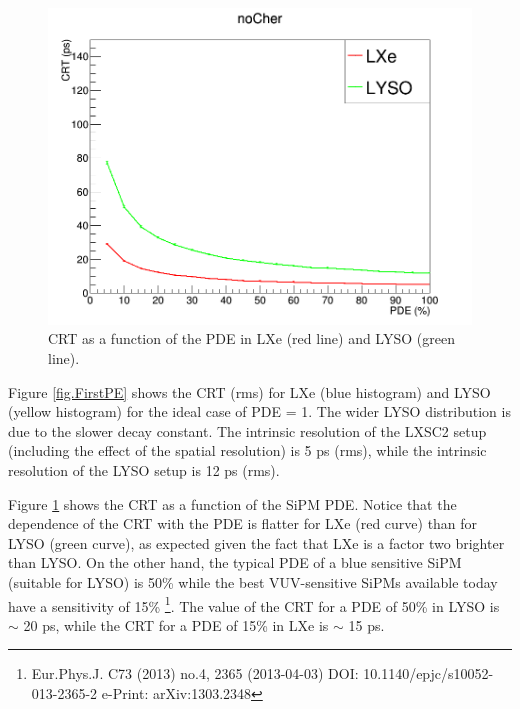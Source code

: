 \documentclass[review]{elsarticle}
\begin{document}
{\begin{figure}[!bhtp]
	\centering
	\includegraphics[scale=3]{../img/CRTvsPDELXeLYSONoJitterFstPE.png}
	\caption{\label{fig.crt1} CRT as a function of the PDE in LXe (red line) and LYSO (green line). }
\end{figure}

 Figure \ref{fig.FirstPE} shows the CRT (rms) for LXe (blue histogram) and LYSO (yellow histogram) for the ideal case of PDE = 1. The wider LYSO distribution is due to the slower decay constant. The intrinsic resolution of the LXSC2 setup (including the effect of the spatial resolution) is 5 ps (rms), while the
 intrinsic resolution of the LYSO setup is 12 ps (rms). 
 
 Figure \ref{fig.crt1} shows the CRT as a function of the
 SiPM PDE. Notice that the dependence of the CRT with the PDE is flatter for LXe (red curve) than for LYSO (green curve), as expected given the fact that LXe is a factor two brighter than LYSO. On the other hand, the typical PDE of a blue sensitive SiPM (suitable for LYSO) is 50\% while the best VUV-sensitive SiPMs available today have a sensitivity of 15\% \footnote{Eur.Phys.J. C73 (2013) no.4, 2365
(2013-04-03)
DOI: 10.1140/epjc/s10052-013-2365-2
e-Print: arXiv:1303.2348}. The value of the CRT for a PDE of 50\% in LYSO is $\sim$ 20 ps, while
the CRT for a PDE of 15\% in LXe is $\sim$ 15 ps.
  
}
\end{document}
